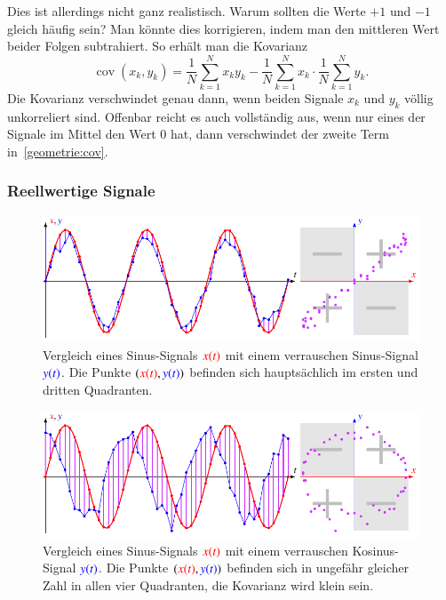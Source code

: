 Dies ist allerdings nicht ganz realistisch.
Warum sollten die Werte $+1$ und $-1$ gleich häufig sein?
Man könnte dies korrigieren, indem man den mittleren Wert beider Folgen
subtrahiert.
So erhält man die Kovarianz
\begin{equation}
\operatorname{cov}(x_k,y_k)
=
\frac1{N} \sum_{k=1}^N x_ky_k
-
\frac1{N} \sum_{k=1}^N x_k
\cdot
\frac1{N} \sum_{k=1}^N y_k.
\label{geometrie:cov}
\end{equation}
Die Kovarianz verschwindet genau dann, wenn beiden Signale $x_k$ und $y_k$
völlig unkorreliert sind.
Offenbar reicht es auch vollständig aus, wenn nur eines der Signale
im Mittel den Wert $0$ hat, dann verschwindet der zweite Term
in~\eqref{geometrie:cov}.

\subsubsection{Reellwertige Signale}
\begin{figure}
\centering
\includegraphics[width=\hsize]{chapters/1-geometrie/images/sinsin.pdf}
\caption{Vergleich eines Sinus-Signals $\color{red}x(t)$ mit einem
verrauschen Sinus-Signal $\color{blue}y(t)$.
Die Punkte $({\color{red}x(t)},{\color{blue}y(t)})$ befinden sich
hauptsächlich im ersten und dritten Quadranten.
\label{geometrie:kovarianz:sinsin:image}}
\end{figure}
\begin{figure}
\centering
\includegraphics[width=\hsize]{chapters/1-geometrie/images/sincos.pdf}
\caption{Vergleich eines Sinus-Signals $\color{red}x(t)$ mit einem
verrauschen Kosinus-Signal $\color{blue}y(t)$.
Die Punkte $({\color{red}x(t)},{\color{blue}y(t)})$ befinden sich
in ungefähr gleicher Zahl in allen vier Quadranten, die Kovarianz
wird klein sein.
\label{geometrie:kovarianz:sincos:image}}
\end{figure}

